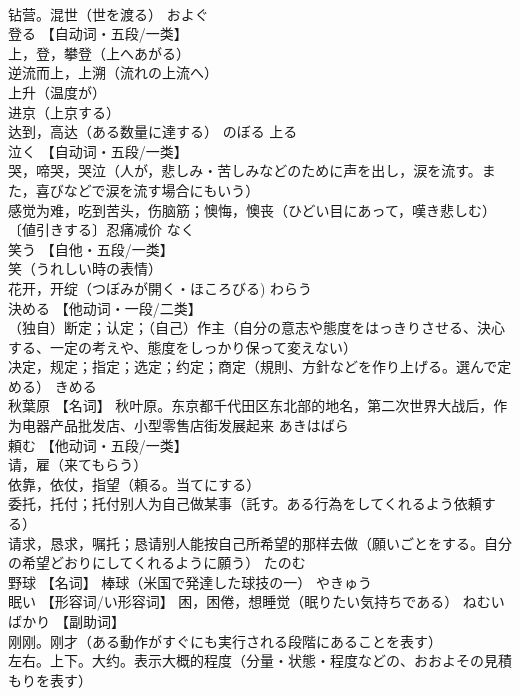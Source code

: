 \documentclass[8pt]{extreport}
\begin{document}
\begin{CJK}{UTF8}{min}
\\	钻营。混世（世を渡る）	およぐ	
\\	登る	【自动词・五段/一类】 
\\	上，登，攀登（上へあがる） 
\\	逆流而上，上溯（流れの上流へ） 
\\	上升（温度が） 
\\	进京（上京する） 
\\	达到，高达（ある数量に達する）	のぼる	上る
\\	泣く	【自动词・五段/一类】 
\\	哭，啼哭，哭泣（人が，悲しみ・苦しみなどのために声を出し，涙を流す。また，喜びなどで涙を流す場合にもいう） 
\\	感觉为难，吃到苦头，伤脑筋；懊悔，懊丧（ひどい目にあって，嘆き悲しむ） 
\\	〔値引きする〕忍痛减价	なく	
\\	笑う	【自他・五段/一类】 
\\	笑（うれしい時の表情） 
\\	花开，开绽（つぼみが開く・ほころびる)	わらう	
\\	決める	【他动词・一段/二类】 
\\	（独自）断定；认定；（自己）作主（自分の意志や態度をはっきりさせる、決心する、一定の考えや、態度をしっかり保って変えない） 
\\	决定，规定；指定；选定；约定；商定（規則、方針などを作り上げる。選んで定める）	きめる	
\\	秋葉原	【名词】 秋叶原。东京都千代田区东北部的地名，第二次世界大战后，作为电器产品批发店、小型零售店街发展起来	あきはばら	
\\	頼む	【他动词・五段/一类】 
\\	请，雇（来てもらう） 
\\	依靠，依仗，指望（頼る。当てにする） 
\\	委托，托付；托付别人为自己做某事（託す。ある行為をしてくれるよう依頼する） 
\\	请求，恳求，嘱托；恳请别人能按自己所希望的那样去做（願いごとをする。自分の希望どおりにしてくれるように願う）	たのむ	
\\	野球	【名词】 棒球（米国で発達した球技の一）	やきゅう	
\\	眠い	【形容词/い形容词】 困，困倦，想睡觉（眠りたい気持ちである）	ねむい	
\\	ばかり	【副助词】 
\\	刚刚。刚才（ある動作がすぐにも実行される段階にあることを表す） 
\\	左右。上下。大约。表示大概的程度（分量・状態・程度などの、おおよその見積もりを表す） 

\end{CJK}
\end{document}
